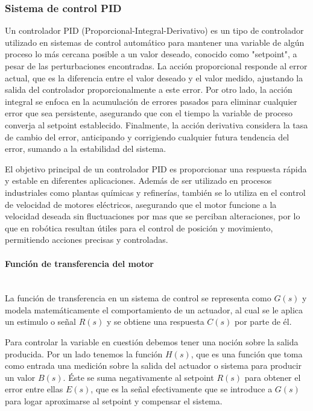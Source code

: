 \subsubsection{Sistema de control PID}
Un controlador PID (Proporcional-Integral-Derivativo) es un tipo de controlador utilizado en sistemas de control automático para mantener una variable de algún proceso lo más cercana posible a un valor deseado, conocido como "setpoint", a pesar de las perturbaciones encontradas. La acción proporcional responde al error actual, que es la diferencia entre el valor deseado y el valor medido, ajustando la salida del controlador proporcionalmente a este error. Por otro lado, la acción integral se enfoca en la acumulación de errores pasados para eliminar cualquier error que sea persistente, asegurando que con el tiempo la variable de proceso converja al setpoint establecido. Finalmente, la acción derivativa considera la tasa de cambio del error, anticipando y corrigiendo cualquier futura tendencia del error, sumando a la estabilidad del sistema.

El objetivo principal de un controlador PID es proporcionar una respuesta rápida y estable en diferentes aplicaciones. Además de ser utilizado en procesos industriales como plantas químicas y refinerías, también se lo utiliza en el control de velocidad de motores eléctricos, asegurando que el motor funcione a la velocidad deseada sin fluctuaciones por mas que se perciban alteraciones, por lo que en robótica resultan útiles para el control de posición y movimiento, permitiendo acciones precisas y controladas.

\paragraph{Función de transferencia del motor} \mbox{} \vspace{8pt} \\
La función de transferencia en un sistema de control se representa como $G(s)$ y modela matemáticamente el comportamiento de un actuador, al cual se le aplica un estimulo o señal $R(s)$ y se obtiene una respuesta $C(s)$ por parte de él.

Para controlar la variable en cuestión debemos tener una noción sobre la salida producida. Por un lado tenemos la función $H(s)$, que es una función que toma como entrada una medición sobre la salida del actuador o sistema para producir un valor $B(s)$. Éste se suma negativamente al setpoint $R(s)$ para obtener el error entre ellas $E(s)$, que es la señal efectivamente que se introduce a $G(s)$ para logar aproximarse al setpoint y compensar el sistema.

